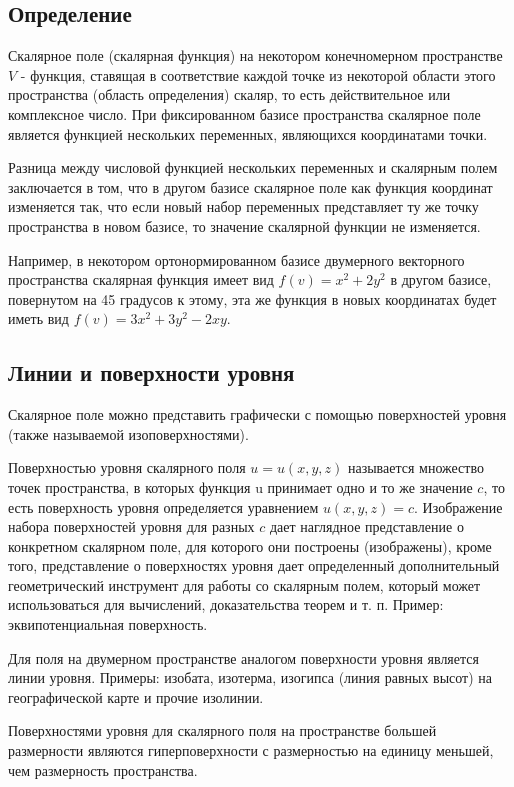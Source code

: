 \documentclass[11pt]{article}
\begin{document}
\subsection{Определение}
Скалярное поле (скалярная функция) на некотором конечномерном пространстве $V$ - функция, ставящая в соответствие каждой точке из некоторой области этого пространства (область определения) скаляр, то есть действительное или комплексное число. При фиксированном базисе пространства скалярное поле является функцией нескольких переменных, являющихся координатами точки.

Разница между числовой функцией нескольких переменных и скалярным полем заключается в том, что в другом базисе скалярное поле как функция координат изменяется так, что если новый набор переменных представляет ту же точку пространства в новом базисе, то значение скалярной функции не изменяется.

Например, в некотором ортонормированном базисе двумерного векторного пространства скалярная функция имеет вид $f(v)=x^{2}+2y^{2}$ в другом базисе, повернутом на 45 градусов к этому, эта же функция в новых координатах будет иметь вид $f(v)=3x^{2}+3y^{2}-2xy$.
\subsection{Линии и поверхности уровня}
Скалярное поле можно представить графически с помощью поверхностей уровня (также называемой изоповерхностями).

Поверхностью уровня скалярного поля $u=u(x,y,z)$ называется множество точек пространства, в которых функция u принимает одно и то же значение $c$, то есть поверхность уровня определяется уравнением $u(x,y,z)=c$. Изображение набора поверхностей уровня для разных $c$ дает наглядное представление о конкретном скалярном поле, для которого они построены (изображены), кроме того, представление о поверхностях уровня дает определенный дополнительный геометрический инструмент для работы со скалярным полем, который может использоваться для вычислений, доказательства теорем и т. п. Пример: эквипотенциальная поверхность.

Для поля на двумерном пространстве аналогом поверхности уровня является линии уровня. Примеры: изобата, изотерма, изогипса (линия равных высот) на географической карте и прочие изолинии.

Поверхностями уровня для скалярного поля на пространстве большей размерности являются гиперповерхности с размерностью на единицу меньшей, чем размерность пространства.
\end{document}
